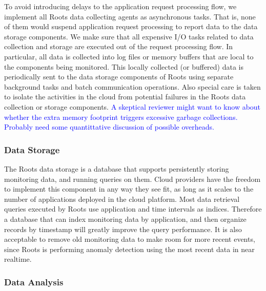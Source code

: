 To avoid introducing delays to the application request processing flow, we implement
all Roots data collecting agents as asynchronous tasks. That is, none of them would
suspend application request processing to report data to the data storage components.
We make sure that all expensive I/O tasks related to data collection and storage are
executed out of the request processing flow.
In particular, all data is collected into log files or memory buffers that are local to the components being
monitored. This locally collected (or buffered) data is periodically sent
to the data storage components of Roots using separate background tasks and batch communication
operations. Also special care is taken to isolate the activities in the cloud from potential
failures in the Roots data collection or storage components.
\textcolor{blue}{A skeptical reviewer might want to know about whether the
extra memory footprint triggers excessive garbage collections.  Probably need
some quantittative discussion of possible overheads.}

\subsubsection{Data Storage}

The Roots data storage is a database that supports persistently storing monitoring data, and running
queries on them.  
Cloud providers have the freedom to implement this component in any way they see fit, as long
as it scales to the number of applications deployed in the cloud platform. Most data retrieval queries executed
by Roots use application and time intervals as indices. Therefore a database that can index monitoring
data by application, and then organize records by timestamp will greatly improve the query performance.
It is also acceptable to remove old monitoring data to make room for more recent events, since Roots
is performing anomaly detection using the most recent data in near realtime.

\subsubsection{Data Analysis}

